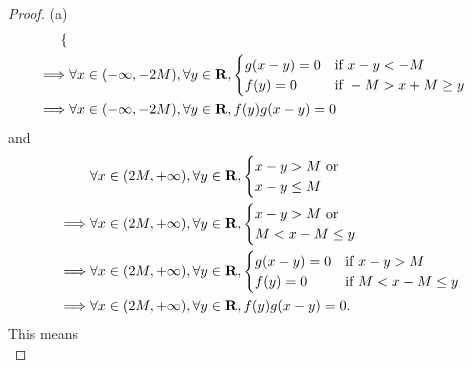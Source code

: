 \begin{proof}{(a)}
\begin{align*}
\begin{cases}
                                                               \end{cases}                      \\
    \implies & \forall x \in (-\infty, -2M), \forall y \in \mathbf{R}, \begin{cases}
                                                                 g(x - y) = 0 & \text{if } x - y < -M        \\
                                                                 f(y) = 0     & \text{if } -M > x + M \geq y
                                                               \end{cases} \\
    \implies & \forall x \in (-\infty, -2M), \forall y \in \mathbf{R}, f(y) g(x - y) = 0
  \end{align*}
  and
  \begin{align*}
             & \forall x \in (2M, +\infty), \forall y \in \mathbf{R}, \begin{cases}
                                                                x - y > M \text{ or } \\
                                                                x - y \leq M
                                                              \end{cases}                      \\
    \implies & \forall x \in (2M, +\infty), \forall y \in \mathbf{R}, \begin{cases}
                                                                x - y > M \text{ or } \\
                                                                M < x - M \leq y
                                                              \end{cases}                      \\
    \implies & \forall x \in (2M, +\infty), \forall y \in \mathbf{R}, \begin{cases}
                                                                g(x - y) = 0 & \text{if } x - y > M        \\
                                                                f(y) = 0     & \text{if } M < x - M \leq y
                                                              \end{cases} \\
    \implies & \forall x \in (2M, +\infty), \forall y \in \mathbf{R}, f(y) g(x - y) = 0.
  \end{align*}
  This means
  \[
\]
\end{proof}
